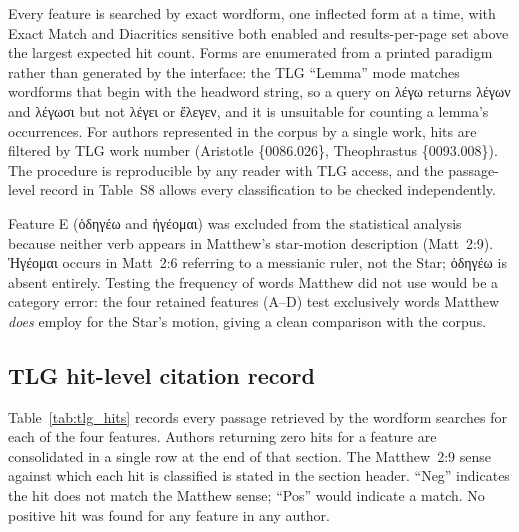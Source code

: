 \documentclass[11pt,a4paper]{article}
\newcommand{\grk}[1]{{\fontencoding{LGR}\selectfont #1}}
\newcommand{\grk}[1]{{\greekfont #1}}
\begin{document}
\noindent Every feature is searched by exact wordform, one inflected form at a
time, with \textsf{Exact Match} and \textsf{Diacritics sensitive} both enabled
and results-per-page set above the largest expected hit count. Forms are
enumerated from a printed paradigm rather than generated by the interface: the
TLG ``Lemma'' mode matches wordforms that begin with the headword string, so a
query on \grk{λέγω} returns \grk{λέγων} and \grk{λέγωσι} but not \grk{λέγει} or
\grk{ἔλεγεν}, and it is unsuitable for counting a lemma's occurrences. For
authors represented in the corpus by a single work, hits are filtered by TLG
work number (Aristotle \{0086.026\}, Theophrastus \{0093.008\}). The procedure
is reproducible by any reader with TLG access, and the passage-level record in
Table~S8 allows every classification to be checked independently.

\noindent Feature E (\grk{ὁδηγέω} and \grk{ἡγέομαι}) was excluded from the
statistical analysis because neither verb appears in Matthew's star-motion
description (Matt~2:9). \grk{Ἡγέομαι} occurs in Matt~2:6 referring to a
messianic ruler, not the Star; \grk{ὁδηγέω} is absent entirely.
Testing the frequency of words Matthew did not use would be a category
error: the four retained features (A--D) test exclusively words Matthew
\emph{does} employ for the Star's motion, giving a clean comparison with the
corpus.

\subsection{TLG hit-level citation record}
\label{subsec:tlg_hits}

Table~\ref{tab:tlg_hits} records every passage retrieved by the wordform searches
for each of the four features. Authors returning zero hits for a feature are
consolidated in a single row at the end of that section. The Matthew~2:9
sense against which each hit is classified is stated in the section header.
``Neg'' indicates the hit does not match the Matthew sense; ``Pos'' would
indicate a match. No positive hit was found for any feature in any author.
\end{document}
